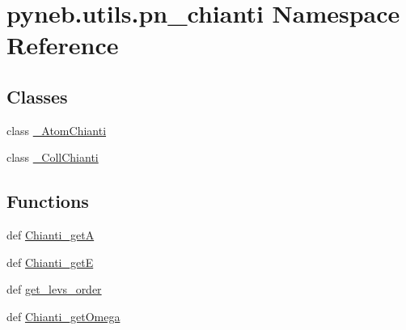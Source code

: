 \hypertarget{namespacepyneb_1_1utils_1_1pn__chianti}{\section{pyneb.\-utils.\-pn\-\_\-chianti Namespace Reference}
\label{namespacepyneb_1_1utils_1_1pn__chianti}
}
\subsection*{Classes}
\begin{DoxyCompactItemize}
\item 
class \hyperlink{classpyneb_1_1utils_1_1pn__chianti_1_1___atom_chianti}{\-\_\-\-Atom\-Chianti}
\item 
class \hyperlink{classpyneb_1_1utils_1_1pn__chianti_1_1___coll_chianti}{\-\_\-\-Coll\-Chianti}
\end{DoxyCompactItemize}
\subsection*{Functions}
\begin{DoxyCompactItemize}
\item 
def \hyperlink{namespacepyneb_1_1utils_1_1pn__chianti_ae49411e98cb7ac96f53887d3f277a041}{Chianti\-\_\-get\-A}
\item 
def \hyperlink{namespacepyneb_1_1utils_1_1pn__chianti_af2ab54887a9b6970ef047eb14a81357d}{Chianti\-\_\-get\-E}
\item 
def \hyperlink{namespacepyneb_1_1utils_1_1pn__chianti_aa5ac8c15155a7a63ddaefa054349ea16}{get\-\_\-levs\-\_\-order}
\item 
def \hyperlink{namespacepyneb_1_1utils_1_1pn__chianti_a651b939729d0f5afb817a47a974bfaa1}{Chianti\-\_\-get\-Omega}
\end{DoxyCompactItemize}


